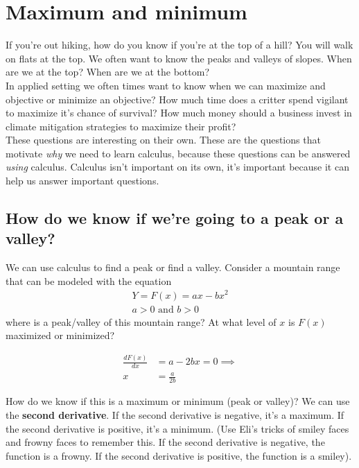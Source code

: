 \documentclass{article}
\begin{document}
\section{Maximum and minimum}
If you're out hiking, how do you know if you're at the top of a hill? You will walk on flats at the top. We often want to know the peaks and valleys of slopes. When are we at the top? When are we at the bottom? \\

In applied setting we often times want to know when we can maximize and objective or minimize an objective? How much time does a critter spend vigilant to maximize it's chance of survival? How much money should a business invest in climate mitigation strategies to maximize their profit? \\

These questions are interesting on their own. These are the questions that motivate \textit{why} we need to learn calculus, because these questions can be answered \textit{using} calculus. Calculus isn't important on its own, it's important because it can help us answer important questions. 

\subsection{How do we know if we're going to a peak or a valley?}
We can use calculus to find a peak or find a valley. Consider a mountain range that can be modeled with the equation
\begin{align}
    Y = F(x) = ax - bx^2 \\
    a > 0 \text{ and } b > 0
\end{align}
where is a peak/valley of this mountain range? At what level of $x$ is $F(x)$ maximized or minimized?

\begin{align}
    \frac{dF(x)}{dx} &= a - 2bx = 0 \implies \\
    x &= \frac{a}{2b}
\end{align}

How do we know if this is a maximum or minimum (peak or valley)? We can use the \textbf{second derivative}. If the second derivative is negative, it's a maximum. If the second derivative is positive, it's a minimum. (Use Eli's tricks of smiley faces and frowny faces to remember this. If the second derivative is negative, the function is a frowny. If the second derivative is positive, the function is a smiley). \\
\end{document}
